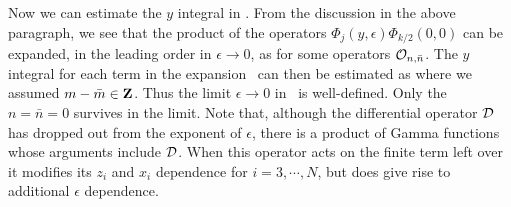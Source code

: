 Now we can estimate the $y$ integral
in  . From the discussion in the above
paragraph, we see that
the product of the operators $\Phi_j(y, \epsilon)
\Phi_{k/2}(0,0)$ can be expanded, in the leading
order in $\epsilon \rightarrow 0$, as
\eqn{}
for some operators ${\cal O}_{n, \bar n}$.
The $y$ integral for each term in the expansion
\smallepsilonexpansion\ can then be estimated
as
\eqn{}
where we assumed $m-\bar m \in {\bf Z}$.
Thus the limit $\epsilon \rightarrow 0$
in \ is well-defined.
Only the $n=\bar n=0$
survives in the limit. Note that, although the
differential operator ${\cal D}$ has dropped out
from the exponent of $\epsilon$, there is a
product of Gamma functions whose arguments
include ${\cal D}$. When this operator acts on the finite term left
over it modifies its $z_i$ and $x_i$ dependence for $i=3,\cdots, N$,
but does give rise to additional $\epsilon$ dependence.
%


